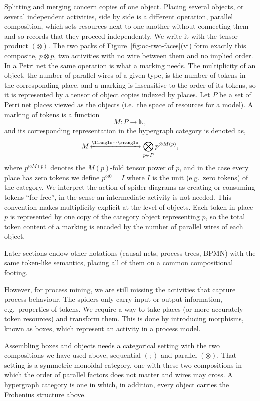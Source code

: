 Splitting and merging concern copies of one object. Placing
several objects, or several independent activities, side by side is a different operation,
parallel composition, which sets resources next to one another without connecting them and
so records that they proceed independently. We write it with the tensor product
$(\otimes)$. The two packs of Figure~\ref{fig:oc-two-faces}(vi) form exactly this
composite, $p\otimes p$, two activities with no wire between them and no implied
order. In a Petri net the same operation is what a marking needs. The multiplicity of an
object, the number of parallel wires of a given type, is the number of tokens in the
corresponding place, and a marking is insensitive to the order of its tokens, so it is
represented by a tensor of object copies indexed by places. Let \(P\) be a set of Petri net places viewed as the objects (i.e.\ the space of resources for a model). A marking of tokens is a function
\[
M : P \to \mathbb{N},
\]
and its corresponding representation in the hypergraph category is denoted as,
\[
M
\xmapsto{\llangle \cdot\cdot\cdot \rrangle}
\bigotimes_{p \in P} p^{\otimes M(p)},
\]
where \(p^{\otimes M(p)}\) denotes the \(M(p)\)-fold tensor power of \(p\), and in the case every place has zero tokens we define $p^{\otimes{}0}=I$ where $I$ is the unit (e.g.\ zero tokens) of the category. We interpret the action of spider diagrams as creating or consuming tokens ``for free'', in the sense an intermediate activity is not needed.
This convention makes multiplicity explicit at the level of objects. Each token in place \(p\) is represented by one copy of the category object representing \(p\), so the total token content of a marking is encoded by the number of parallel wires of each object.

Later sections endow other notations (causal nets, process trees, BPMN) with the same token-like semantics, placing all of them on a common compositional footing.

However, for process mining, we are still missing the activities that capture process behaviour. The spiders only carry input or output information, e.g.\ properties of tokens. We require a way to take places (or more accurately token resources) and transform them. This is done by introducing morphisms, known as boxes, which represent an activity in a process model.

Assembling boxes and objects needs a categorical setting with the two compositions we have
used above, sequential $(;)$ and parallel $(\otimes)$. That setting is a symmetric monoidal
category, one with these two compositions in which the order of parallel factors
does not matter and wires may cross. A hypergraph category is one in which, in addition,
every object carries the Frobenius structure above.

